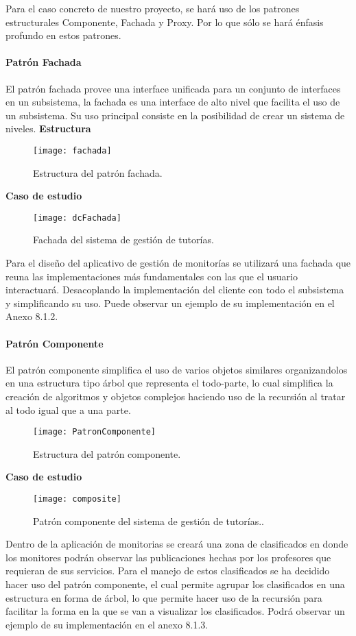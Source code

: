 Para el caso concreto de nuestro proyecto, se hará uso de los patrones estructurales Componente, Fachada y Proxy. Por lo que sólo se hará énfasis profundo en estos patrones.
\paragraph{Patrón Fachada}
\indent El patrón fachada provee una interface unificada para un conjunto de interfaces en un subsistema, la fachada es una interface de alto nivel que facilita el uso de un subsistema. Su uso principal consiste en la posibilidad de crear un sistema de niveles\cite{Bol_2014}.
\newline
\indent\textbf{Estructura}
\newline
\begin{figure}[H]
	\centering
	\texttt{[image: fachada]}
    \centering
    \caption{Estructura del patrón fachada.}
	\label{fig:eFachada}
\end{figure}
\indent\textbf{Caso de estudio}
\begin{figure}[H]
	\centering
	\texttt{[image: dcFachada]}
    \centering
    \caption{Fachada del sistema de gestión de tutorías.}
	\label{fig:dcFachada}
\end{figure}
\indent Para el diseño del aplicativo de gestión de monitorías se utilizará una fachada que reuna las implementaciones más fundamentales con las que el usuario interactuará. Desacoplando la implementación del cliente con todo el subsistema y simplificando su uso. Puede observar un ejemplo de su implementación en el Anexo 8.1.2.
\newpage
\paragraph{Patrón Componente}
El patrón componente simplifica el uso de varios objetos similares organizandolos en una estructura tipo árbol que representa el todo-parte\cite{Bol_2014}, lo cual simplifica la creación de algoritmos y objetos complejos haciendo uso de la recursión al tratar al todo igual que a una parte.
\begin{figure}[H]
	\centering
	\texttt{[image: PatronComponente]}
    \centering
    \caption{Estructura del patrón componente.}
	\label{fig:eComponente}
\end{figure}
\indent\textbf{Caso de estudio}
\newline
\begin{figure}[H]
	\centering
	\texttt{[image: composite]}
    \centering
    \caption{Patrón componente del sistema de gestión de tutorías..}
	\label{fig:composite}
\end{figure}
\indent Dentro de la aplicación de monitorias se creará una zona de clasificados en donde los monitores podrán observar las publicaciones hechas por los profesores que requieran de sus servicios. Para el manejo de estos clasificados se ha decidido hacer uso del patrón componente, el cual permite agrupar los clasificados en una estructura en forma de árbol, lo que permite hacer uso de la recursión para facilitar la forma en la que se van a visualizar los clasificados. Podrá observar un ejemplo de su implementación en el anexo 8.1.3. 
\newpage
